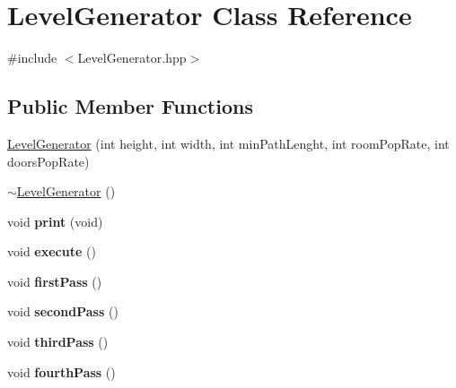 \hypertarget{class_level_generator}{\section{Level\+Generator Class Reference}
\label{class_level_generator}
}


{\ttfamily \#include $<$Level\+Generator.\+hpp$>$}

\subsection*{Public Member Functions}
\begin{DoxyCompactItemize}
\item 
\hyperlink{class_level_generator_a2ed675e422aedcf5ecab936468627128}{Level\+Generator} (int height, int width, int min\+Path\+Lenght, int room\+Pop\+Rate, int doors\+Pop\+Rate)
\item 
\hyperlink{class_level_generator_a9bd612e10a3d769537ba042a76c0cb5f}{$\sim$\+Level\+Generator} ()
\item 
\hypertarget{class_level_generator_ad3a873efd53cec998e5b3cbec90b1e6d}{void {\bfseries print} (void)}\label{class_level_generator_ad3a873efd53cec998e5b3cbec90b1e6d}

\item 
\hypertarget{class_level_generator_a0adda93371151dcbda015fd4a9a5b971}{void {\bfseries execute} ()}\label{class_level_generator_a0adda93371151dcbda015fd4a9a5b971}

\item 
\hypertarget{class_level_generator_a67392d5702d8bb9b28d3b87cfa4f4435}{void {\bfseries first\+Pass} ()}\label{class_level_generator_a67392d5702d8bb9b28d3b87cfa4f4435}

\item 
\hypertarget{class_level_generator_aaed4a6d35bf4ea14a1d472b247720f46}{void {\bfseries second\+Pass} ()}\label{class_level_generator_aaed4a6d35bf4ea14a1d472b247720f46}

\item 
\hypertarget{class_level_generator_a8e8540de5d26ae5fd37f01863bb3a3ab}{void {\bfseries third\+Pass} ()}\label{class_level_generator_a8e8540de5d26ae5fd37f01863bb3a3ab}

\item 
\hypertarget{class_level_generator_a9b9e75025c7dcacb88bcb717f2aa9f3b}{void {\bfseries fourth\+Pass} ()}\label{class_level_generator_a9b9e75025c7dcacb88bcb717f2aa9f3b}


\end{DoxyCompactItemize}
